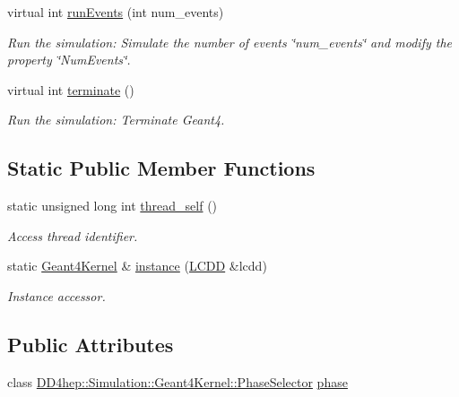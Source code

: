 \begin{DoxyCompactItemize}
$$virtual int \hyperlink{class_d_d4hep_1_1_simulation_1_1_geant4_kernel_a0ce3dec62c67dbaf72748238983bb898}{runEvents} (int num\_\-events)
\begin{DoxyCompactList}\small\item\em Run the simulation: Simulate the number of events \char`\"{}num\_\-events\char`\"{} and modify the property \char`\"{}NumEvents\char`\"{}. \item\end{DoxyCompactList}\item 
virtual int \hyperlink{class_d_d4hep_1_1_simulation_1_1_geant4_kernel_ae73e828fed81e3343fe49f08701d3ac3}{terminate} ()
\begin{DoxyCompactList}\small\item\em Run the simulation: Terminate Geant4. \item\end{DoxyCompactList}\end{DoxyCompactItemize}
\subsection*{Static Public Member Functions}
\begin{DoxyCompactItemize}
\item 
static unsigned long int \hyperlink{class_d_d4hep_1_1_simulation_1_1_geant4_kernel_a6f7fb6760f8432658a837a65bb557fe5}{thread\_\-self} ()
\begin{DoxyCompactList}\small\item\em Access thread identifier. \item\end{DoxyCompactList}\item 
static \hyperlink{class_d_d4hep_1_1_simulation_1_1_geant4_kernel}{Geant4Kernel} \& \hyperlink{class_d_d4hep_1_1_simulation_1_1_geant4_kernel_a791f6c4b8f9257f98d453457655870de}{instance} (\hyperlink{class_d_d4hep_1_1_geometry_1_1_l_c_d_d}{LCDD} \&lcdd)
\begin{DoxyCompactList}\small\item\em Instance accessor. \item\end{DoxyCompactList}\end{DoxyCompactItemize}
\subsection*{Public Attributes}
\begin{DoxyCompactItemize}
\item 
class \hyperlink{class_d_d4hep_1_1_simulation_1_1_geant4_kernel_1_1_phase_selector}{DD4hep::Simulation::Geant4Kernel::PhaseSelector} \hyperlink{class_d_d4hep_1_1_simulation_1_1_geant4_kernel_ae7d402daf48f3cd062f1617c5a7ee429}{phase}
\end{DoxyCompactItemize}

